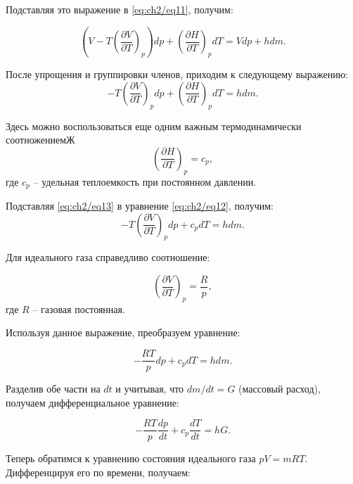 Подставляя это выражение в \eqref{eq:ch2/eq11}, получим:

\begin{equation*}
    \left( V - T \left(
            \frac{\partial V}{\partial T}
        \right)_p \right) dp + \left(
        \frac{\partial H}{\partial T}
    \right)_p dT = Vdp + hdm.
\end{equation*}

После упрощения и группировки членов, приходим к следующему выражению:
\begin{equation}\label{eq:ch2/eq12}
    -T \left(
        \frac{\partial V}{\partial T}
    \right)_p dp + \left(
        \frac{\partial H}{\partial T}
    \right)_p dT = hdm.
\end{equation}

Здесь можно воспользоваться еще одним важным термодинамически соотножениемЖ
\begin{equation}\label{eq:ch2/eq13}
    \left(
        \frac{\partial H}{\partial T}
    \right)_p = c_p,
\end{equation}
где $c_p$ -- удельная теплоемкость при постоянном давлении.

Подставляя \eqref{eq:ch2/eq13} в уравнение \eqref{eq:ch2/eq12}, получим:
\begin{equation}\label{eq:ch2/eq14}
    -T \left(
        \frac{\partial V}{\partial T}
    \right)_p dp + c_p dT = hdm.
\end{equation}

Для идеального газа справедливо соотношение:

\begin{equation*}
    \left(\frac{\partial V}{\partial T}\right)_p = \frac{R}{p},
\end{equation*}
где $R$ -- газовая постоянная.

Используя данное выражение, преобразуем уравнение:

\begin{equation*}
    -\frac{RT}{p} dp + c_p dT = h dm.
\end{equation*}

Разделив обе части на $dt$ и учитывая, что $dm/dt = G$ (массовый расход), получаем дифференциальное уравнение:

\begin{equation*}
    -\frac{RT}{p} \frac{dp}{dt} + c_p \frac{dT}{dt} = hG.
\end{equation*}

Теперь обратимся к уравнению состояния идеального газа $pV = mRT$. Дифференцируя его по времени, получаем:

